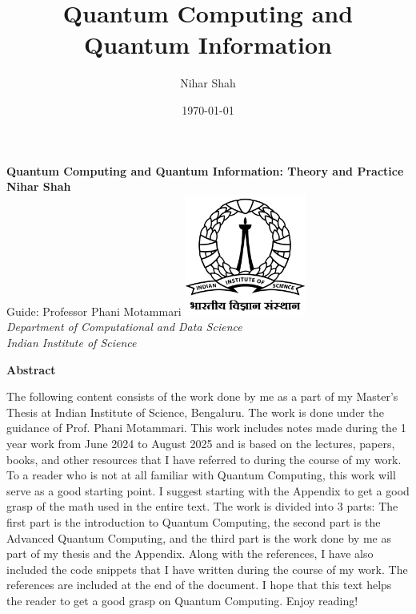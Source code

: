 \documentclass[12pt, oneside]{book}
\theoremstyle{definition}
\theoremstyle{definition}
\theoremstyle{remark}
\newcommand{\abstractname}{Abstract}
\newenvironment{abstract}{%
\clearpage
\null\vfill
\begin{center}%
    \bfseries \abstractname
\end{center}}%
{\vfill\null}
\begin{document}
\frontmatter

\title{\vspace{-3.0cm}Quantum Computing and Quantum Information}  %
\author{Nihar Shah}  %
\date{\today}  %
\maketitle  %

\begin{center}
\vspace*{2cm}
\textbf{Quantum Computing and Quantum Information: Theory and Practice}\\[1cm]
\textbf{Nihar Shah}\\[1cm]
Guide: Professor Phani Motammari
\vfill
\includegraphics[width=0.3\textwidth]{../images/IISc_Master_Seal_Black.jpg}\\[1cm]
\large \textit{Department of Computational and Data Science}\\
\large \textit{Indian Institute of Science}
\vfill
\end{center}

\frontmatter

\begin{abstract}
The following content consists of the work done by me as a part of my Master's Thesis at Indian
Institute of Science, Bengaluru. The work is done under the guidance of Prof. Phani Motammari. 
This work includes notes made during the 1 year work from June 2024 to August 2025 and is based on the
lectures, papers, books, and other resources that I have referred to during the course of my work.
To a reader who is not at all familiar with Quantum Computing, this work will serve as a good starting point. 
I suggest starting with the Appendix to get a good grasp of the math used in the entire text. 
The work is divided into 3 parts: The first part is the introduction to Quantum Computing, the second part is the
Advanced Quantum Computing, and the third part is the work done by me as part of my thesis and the Appendix. Along with the references, 
I have also included the code snippets that I have written during the course of my work. The references are included at the end of the document.
I hope that this text helps the reader to get a good grasp on Quantum Computing. Enjoy reading!
\end{abstract}
\end{document}
